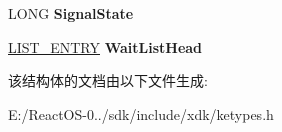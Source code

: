 \begin{DoxyCompactItemize}
\begin{tabbing}
\end{tabbing}\item 
\mbox{\label{struct___d_i_s_p_a_t_c_h_e_r___h_e_a_d_e_r_ae08f84f6c1aef190a52bc8436649ac3f}} 
L\+O\+NG {\bfseries Signal\+State}
\item 
\mbox{\label{struct___d_i_s_p_a_t_c_h_e_r___h_e_a_d_e_r_a9dd7a963d7db0ab3293d3e75c52d6bbc}} 
\hyperlink{struct___l_i_s_t___e_n_t_r_y}{L\+I\+S\+T\+\_\+\+E\+N\+T\+RY} {\bfseries Wait\+List\+Head}
\end{DoxyCompactItemize}


该结构体的文档由以下文件生成\+:\begin{DoxyCompactItemize}
\item 
E\+:/\+React\+O\+S-\/0../sdk/include/xdk/ketypes.\+h\end{DoxyCompactItemize}
